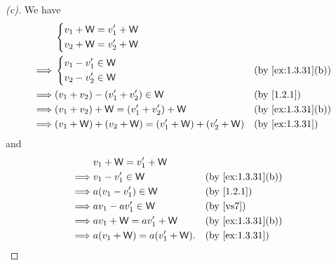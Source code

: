 \begin{proof}[(c)]
	We have
	\begin{align*}
		         & \begin{dcases}
			           v_1 + \W = v_1' + \W \\
			           v_2 + \W = v_2' + \W
		           \end{dcases}                                                       \\
		\implies & \begin{dcases}
			           v_1 - v_1' \in \W \\
			           v_2 - v_2' \in \W
		           \end{dcases}                                &  & \by{ex:1.3.31}[b]         \\
		\implies & (v_1 + v_2) - (v_1' + v_2') \in \W                  &  & \by{1.2.1}        \\
		\implies & (v_1 + v_2) + \W = (v_1' + v_2') + \W               &  & \by{ex:1.3.31}[b] \\
		\implies & (v_1 + \W) + (v_2 + \W) = (v_1' + \W) + (v_2' + \W) &  & \by{ex:1.3.31}
	\end{align*}
	and
	\begin{align*}
		         & v_1 + \W = v_1' + \W                                   \\
		\implies & v_1 - v_1' \in \W           &  & \by{ex:1.3.31}[b]     \\
		\implies & a(v_1 - v_1') \in \W        &  & \by{1.2.1}            \\
		\implies & av_1 - av_1' \in \W         &  & \text{(by \ref{vs7})} \\
		\implies & av_1 + \W = av_1' + \W      &  & \by{ex:1.3.31}[b]     \\
		\implies & a(v_1 + \W) = a(v_1' + \W). &  & \by{ex:1.3.31}
	\end{align*}
\end{proof}

